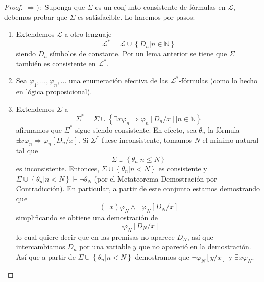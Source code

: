 \documentclass[12pt]{report}
\newcounter{it}
\theoremstyle{largebreak}
\begin{document}
\begin{proof}
        $\Rightarrow):$ Suponga que $\Sigma$ es un conjunto consistente de fórmulas en $\mathcal{L}$, debemos probar que $\Sigma$ es satisfacible. Lo haremos por pasos:
        \begin{enumerate}[label = \textit{(\alph*)}]
            \item Extendemos $\mathcal{L}$ a otro lenguaje
            \begin{equation*}
                \mathcal{L}^*=\mathcal{L}\cup\left\{D_n\Big|n\in\mathbb{N} \right\}
            \end{equation*}
            siendo $D_n$ símbolos de constante. Por un lema anterior se tiene que $\Sigma$ también es consistente en $\mathcal{L}^*$.
            \item Sea $\varphi_1,...,\varphi_n,...$ una enumeración efectiva de las $\mathcal{L}^*$-fórmulas (como lo hecho en lógica proposicional).
            \item Extendemos $\Sigma$ a
            \begin{equation*}
                \Sigma^*=\Sigma\cup\left\{\exists x\varphi_n\Rightarrow\varphi_n[D_n/x]\Big|n\in\mathbb{N} \right\}
            \end{equation*}
            afirmamos que $\Sigma^*$ sigue siendo consistente. En efecto, sea $\theta_n$ la fórmula $\exists x\varphi_n\Rightarrow\varphi_n[D_n/x]$. Si $\Sigma^*$ fuese inconsistente, tomamos $N$ el mínimo natural tal que
            \begin{equation*}
                \Sigma\cup\left\{\theta_n\Big|n\leq N \right\} 
            \end{equation*}
            es inconsistente. Entonces, $\Sigma\cup\left\{\theta_n\Big|n<N \right\}$ es consistente y $\Sigma\cup\left\{\theta_n\Big|n<N \right\}\vdash\neg\theta_N$ (por el Metateorema Demostración por Contradicción). En particular, a partir de este conjunto estamos demostrando que
            \begin{equation*}
                (\exists x)\varphi_N\land\neg\varphi_N[D_N/x]
            \end{equation*}
            simplificando se obtiene una demostración de
            \begin{equation*}
                \neg\varphi_N[D_N/x]
            \end{equation*}
            lo cual quiere decir que en las premisas no aparece $D_N$, así que intercambiamos $D_n$ por una variable $y$ que no apareció en la demostración. Así que a partir de $\Sigma\cup\left\{\theta_n\Big|n<N \right\}$ demostramos que $\neg\varphi_N[y/x]$ y $\exists x\varphi_N$.


\end{enumerate}
\end{proof}
\end{document}
